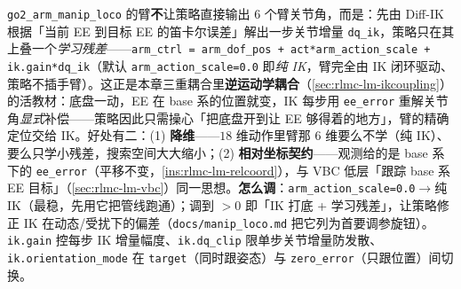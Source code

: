 \begin{insight}\label{ins:rlmc-lm-ikresidual}
\verb|go2_arm_manip_loco| 的臂\textbf{不}让策略直接输出 $6$ 个臂关节角，而是：先由 Diff-IK 根据「当前 EE 到目标 EE 的笛卡尔误差」解出一步关节增量 \verb|dq_ik|，策略只在其上叠一个\emph{学习残差}——\verb|arm_ctrl = arm_dof_pos + act*arm_action_scale + ik.gain*dq_ik|（默认 \verb|arm_action_scale=0.0| 即\emph{纯 IK}，臂完全由 IK 闭环驱动、策略不插手臂）。这正是本章三重耦合里\textbf{逆运动学耦合}（\cref{sec:rlmc-lm-ikcoupling}）的活教材：底盘一动，EE 在 base 系的位置就变，IK 每步用 \verb|ee_error| 重解关节角\emph{显式}补偿——策略因此只需操心「把底盘开到让 EE 够得着的地方」，臂的精确定位交给 IK。好处有二：(1) \textbf{降维}——$18$ 维动作里臂那 $6$ 维要么不学（纯 IK）、要么只学小残差，搜索空间大大缩小；(2) \textbf{相对坐标契约}——观测给的是 base 系下的 \verb|ee_error|（平移不变，\cref{ins:rlmc-lm-relcoord}），与 VBC 低层「跟踪 base 系 EE 目标」（\cref{sec:rlmc-lm-vbc}）同一思想。\textbf{怎么调}：\verb|arm_action_scale=0.0|$\to$纯 IK（最稳，先用它把管线跑通）；调到 $>0$ 即「IK 打底 + 学习残差」，让策略修正 IK 在动态/受扰下的偏差（\verb|docs/manip_loco.md| 把它列为首要调参旋钮）。\verb|ik.gain| 控每步 IK 增量幅度、\verb|ik.dq_clip| 限单步关节增量防发散、\verb|ik.orientation_mode| 在 \verb|target|（同时跟姿态）与 \verb|zero_error|（只跟位置）间切换。
\end{insight}

